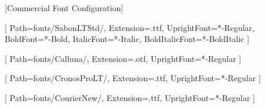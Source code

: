 [Commercial Font Configuration]


\setmainfont{SabonLTStd}[
  Path=fonts/SabonLTStd/,
  Extension=.ttf,
  UprightFont=*-Regular,
  BoldFont=*-Bold,
  ItalicFont=*-Italic,
  BoldItalicFont=*-BoldItalic
]

\newfontfamily{}[
  Path=fonts/Calluna/,
  Extension=.otf,
  UprightFont=*-Regular
]

\newfontfamily{}[
  Path=fonts/CronosProLT/,
  Extension=.ttf,
  UprightFont=*-Regular
]

\newfontfamily{}[
  Path=fonts/CourierNew/,
  Extension=.ttf,
  UprightFont=*-Regular
]
